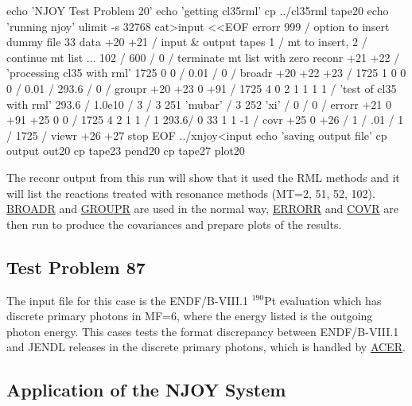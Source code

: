 \small
\begin{ccode}

echo 'NJOY Test Problem 20'
echo 'getting cl35rml'
cp ../cl35rml tape20
echo 'running njoy'
ulimit -s 32768
cat>input <<EOF
errorr
 999     /  option to insert dummy file 33 data
 +20 +21 /  input & output tapes
   1     /  mt to insert,
   2     /  continue mt list ...
 102     /
 600     /
   0     /  terminate mt list with zero
reconr
 +21 +22 /
 'processing cl35 with rml'
 1725 0 0 /
 0.01 /
 0 /
broadr
 +20 +22 +23 /
 1725 1 0 0 0 /
 0.01 /
 293.6 /
 0 /
groupr
 +20 +23 0 +91 /
 1725 4 0 2 1 1 1 1 /
 'test of cl35 with rml'
 293.6 /
 1.0e10 /
 3 /
 3 251 'mubar' /
 3 252 'xi' /
 0 /
 0 /
errorr
 +21 0 +91 +25 0 0 /
 1725 4 2 1 1 /
 1 293.6/
 0 33 1 1 -1 /
covr
 +25 0 +26 /
 1 /
 .01 /
 1 /
 1725 /
viewr
 +26 +27
stop
EOF
../xnjoy<input
echo 'saving output file'
cp output out20
cp tape23 pend20
cp tape27 plot20

\end{ccode}
\normalsize

The reconr output from this run will show that it used the RML
methods and it will list the reactions treated with resonance
methods (MT=2, 51, 52, 102).  \hyperlink{sBROADRhy}{BROADR}
and \hyperlink{sGROUPRhy}{GROUPR} are used in the normal way,
\hyperlink{sERRORRhy}{ERRORR} and \hyperlink{sCOVRhy}{COVR}
are then run to produce the covariances and prepare plots of the
results.

\subsection{Test Problem 87}
\label{ssMandT_20}

The input file for this case is the ENDF/B-VIII.1 $^{190}$Pt evaluation which has
discrete primary photons in MF=6, where the energy listed is the outgoing photon energy.
This cases tests the format discrepancy between ENDF/B-VIII.1 and JENDL releases in 
the discrete primary photons, which is handled by \hyperlink{sACERhy}{ACER}.



\subsection{Application of the NJOY System}
\label{ssMandT_application}

